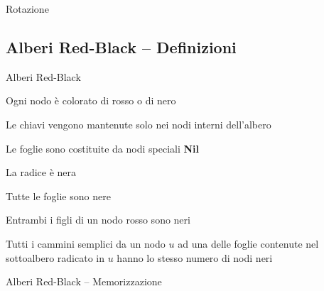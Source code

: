 \begin{frame}{Rotazione}
    

\end{frame}

\subsection{Alberi Red-Black -- Definizioni}

\begin{frame}{Alberi Red-Black}

\vspace{-6pt}
\BIL
\item Ogni nodo è colorato di \alert{rosso} o di \alert{nero}
\item Le chiavi vengono mantenute solo nei nodi interni dell'albero
\item Le foglie sono costituite da nodi speciali \textbf{Nil} 
\EIL
{}
\BEL
\item La radice è nera
\item Tutte le foglie sono nere
\item Entrambi i figli di un nodo rosso sono neri
\item Tutti i cammini semplici da un nodo $u$ ad una delle foglie contenute nel sottoalbero radicato in $u$ hanno lo stesso numero di nodi neri
\EEL


\end{frame}

\begin{frame}{Alberi Red-Black -- Memorizzazione}

\end{frame}

